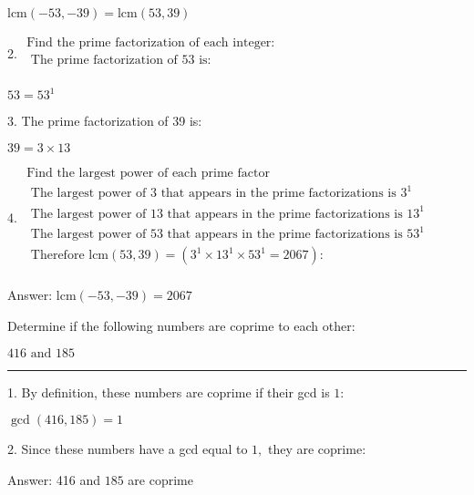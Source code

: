 \documentclass{article}
\begin{document}
lcm$(-53,-39)=\text{lcm}(53,39)$

2. $\begin{array}{l}
\text{Find the prime factorization of each integer}: \\
\text{ The prime factorization of 53 is}: \\
\end{array}$

$53=53^1$

3. The prime factorization of 39 is:

$39=3\times 13$

4. $\begin{array}{l}
\text{Find the largest power of each prime factor }\\
\text{ The largest power of }3\text{ that appears in the prime factorizations is }3^1 \\
\text{ The largest power of 13 that appears in the prime factorizations is }13^1 \\
\text{ The largest power of 53 that appears in the prime factorizations is }53^1 \\
\text{ Therefore lcm}(53,39)=\left(3^1\times 13^1\times 53^1=2067\right): \\
\end{array}$

Answer: lcm$(-53,-39)=2067$

\pagebreak

Determine if the following numbers are coprime to each other:

$416\text{ and }185$

\hrule

1. By definition, these numbers are coprime if their gcd is $1:$

$\gcd (416,185)=1$

2. Since these numbers have a gcd equal to $1,$ they are coprime:

Answer: 416 and $185$ are coprime
\end{document}
